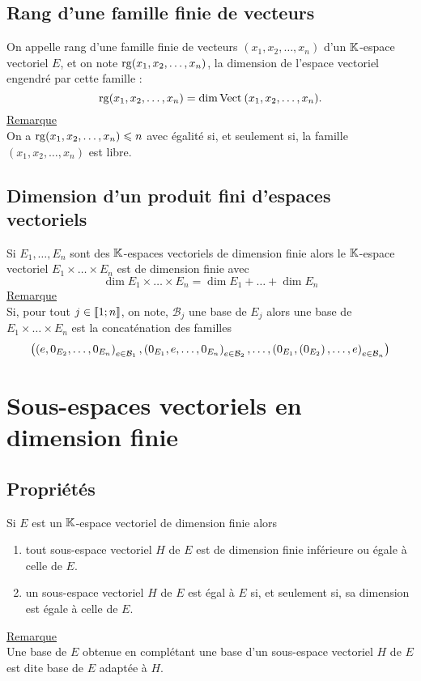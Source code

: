 \subsection{Rang d’une famille finie de vecteurs}
\begin{defprop}
    On appelle rang d’une famille finie de vecteurs \((x_1, x_2, \dots , x_n)\) d’un \(\mathbb{K}\)-espace vectoriel \(E\), et on note \(\operatorname{rg}(x_1, x_2, \dots , x_n)\), la dimension de l’espace vectoriel engendré par cette famille :
    \[\rg (x_1, x_2, \dots , x_n) =  \dim{\Vect{ x_1, x_2, \dots , x_n}}.\]
    \underline{Remarque}\\
    On a \(\operatorname{rg} (x_1, x_2, \dots , x_n) \leqslant n\) avec égalité si, et seulement si, la famille \((x_1, x_2, \dots , x_n)\) est libre.
\end{defprop}

\subsection{Dimension d’un produit fini d’espaces vectoriels}
\begin{defprop}
    Si \(E_1, \dots , E_n\) sont des \(\mathbb{K}\)-espaces vectoriels de dimension finie alors le \(\mathbb{K}\)-espace vectoriel \(E_1 \times\dots\times E_n\) est de dimension finie avec
    \[\dim E_1 \times \dots \times E_n = \dim E_1 + \dots + \dim E_n\]
    \underline{Remarque}\\
    Si, pour tout \(j \in \left\llbracket1;n\right\rrbracket\), on note, \(\mathcal{B}_j\) une base de \(E_j\) alors une base de \(E_1 \times \dots \times E_n\) est la concaténation des familles
    \[\left(\left(e, 0_{E_2} , \dots , 0_{E_n} \right)_{e\in \mathcal{B}_1} , \left(0_{E_1}, e , \dots , 0_{E_n} \right)_{e\in \mathcal{B}_2} , \dots , \left(0_{E_1}, \left(0_{E_2}\right) , \dots , e \right)_{e\in \mathcal{B}_n}\right)\]
\end{defprop}

\section{Sous-espaces vectoriels en dimension finie}
\subsection{Propriétés}
\begin{defprop}
    Si \(E\) est un \(\mathbb{K}\)-espace vectoriel de dimension finie alors
    \begin{enumerate}
        \item tout sous-espace vectoriel \(H\) de \(E\) est de dimension finie inférieure ou égale à celle de \(E\).
        \item un sous-espace vectoriel \(H\) de \(E\) est égal à \(E\) si, et seulement si, sa dimension est égale à celle de \(E\).
    \end{enumerate}
    \underline{Remarque}\\
    Une base de \(E\) obtenue en complétant une base d’un sous-espace vectoriel \(H\) de \(E\) est dite base de \(E\) adaptée à \(H\).
\end{defprop}


